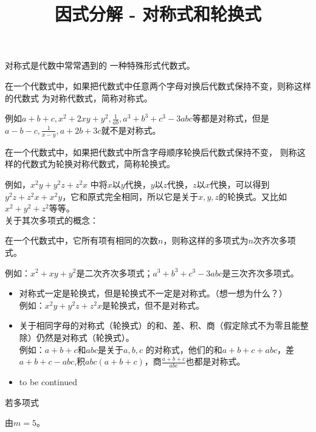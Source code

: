 \documentclass[windows,csize4]{BHCexam}
\title{因式分解 - 对称式和轮换式}
\begin{document}
\maketitle

\begin{groups}
    对称式是代数中常常遇到的 一种特殊形式代数式。\\ 
    \fbox
    {
        \parbox{\textwidth}
        {
            在一个代数式中，如果把代数式中任意两个字母对换后代数式保持不变，则称这样的代数式
            为对称代数式，简称对称式。
        }
    }
    例如$a+b+c,x^2+2xy+y^2,\frac{1}{ab},a^3+b^3+c^3-3abc$等都是对称式，但是
    $a-b-c,\frac{1}{x-y},a+2b+3c$就不是对称式。 \\ 

    \fbox
    {
        \parbox{\textwidth}
        {
            在一个代数式中，如果把代数式中所含字母顺序轮换后代数式保持不变，
            则称这样的代数式为轮换对称代数式，简称轮换式。
        }
    }
    例如，$x^2y+y^2z+z^2x$ 中将$x$以$y$代换，$y$以$z$代换，$z$以$x$代换，可以得到
    $y^2z+z^2x+x^2y$，它和原式完全相同，所以它是关于$x,y,z$的轮换式。又比如$x^2+y^2+z^2$等等。 \\ 

    关于其次多项式的概念： \\
    \fbox
    {
        \parbox{\textwidth}
        {
            在一个代数式中，它所有项有相同的次数$n$，则称这样的多项式为$n$次齐次多项式。
        }
    }
    例如：$x^2+xy+y^2$是二次齐次多项式；$a^3+b^3+c^3-3abc$是三次齐次多项式。


    \begin{itemize}
        \item 对称式一定是轮换式，但是轮换式不一定是对称式。（想一想为什么？）\\ 
        例如：$x^2y+y^2z+z^2x$是轮换式，但不是对称式。
        \item 关于相同字母的对称式（轮换式）的和、差、积、商（假定除式不为零且能整除）仍然是对称式（轮换式）。\\ 
        例如：$a+b+c$和$abc$是关于$a,b,c$ 的对称式，他们的和$a+b+c+abc$，差$a+b+c-abc$,积$abc(a+b+c)$，商$\frac{a+b+c}{abc}$也都是对称式。
        \item to be continued
    \end{itemize}

    \begin{questions}[]
        \question[5] 若多项式
        \begin{solution}{0.5cm}
            \methodonly 由$m=5$。
        \end{solution}
        \vspace{3.5cm}


    \end{questions}
\end{groups}
\end{document}
